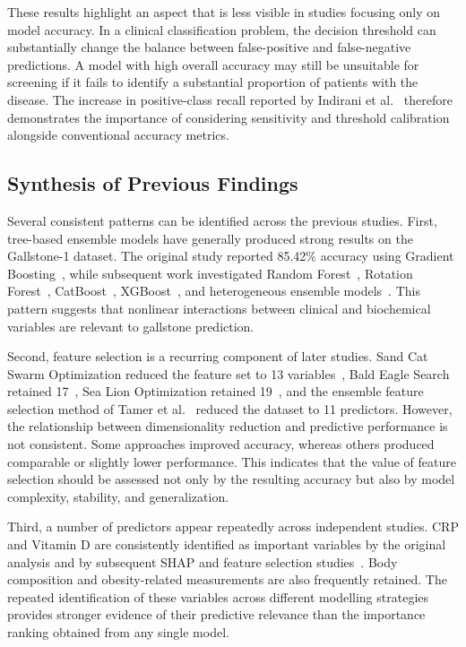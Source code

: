 These results highlight an aspect that is less visible in studies focusing only on model accuracy. In a clinical classification problem, the decision threshold can substantially change the balance between false-positive and false-negative predictions. A model with high overall accuracy may still be unsuitable for screening if it fails to identify a substantial proportion of patients with the disease. The increase in positive-class recall reported by Indirani et al.~\cite{indirani2026ensemble} therefore demonstrates the importance of considering sensitivity and threshold calibration alongside conventional accuracy metrics.

\subsection{Synthesis of Previous Findings}

Several consistent patterns can be identified across the previous studies. First, tree-based ensemble models have generally produced strong results on the Gallstone-1 dataset. The original study reported 85.42\% accuracy using Gradient Boosting~\cite{esen2024early}, while subsequent work investigated Random Forest~\cite{sarker2025gallstone}, Rotation Forest~\cite{shrestha2026metaheuristic}, CatBoost~\cite{das2026sloa}, XGBoost~\cite{rahman2026hbb}, and heterogeneous ensemble models~\cite{indirani2026ensemble}. This pattern suggests that nonlinear interactions between clinical and biochemical variables are relevant to gallstone prediction.

Second, feature selection is a recurring component of later studies. Sand Cat Swarm Optimization reduced the feature set to 13 variables~\cite{sarker2025gallstone}, Bald Eagle Search retained 17~\cite{shrestha2026metaheuristic}, Sea Lion Optimization retained 19~\cite{das2026sloa}, and the ensemble feature selection method of Tamer et al.~\cite{tamer2026novel} reduced the dataset to 11 predictors. However, the relationship between dimensionality reduction and predictive performance is not consistent. Some approaches improved accuracy, whereas others produced comparable or slightly lower performance. This indicates that the value of feature selection should be assessed not only by the resulting accuracy but also by model complexity, stability, and generalization.

Third, a number of predictors appear repeatedly across independent studies. CRP and Vitamin D are consistently identified as important variables by the original analysis and by subsequent SHAP and feature selection studies~\cite{esen2024early,sarker2025gallstone,shrestha2026metaheuristic,das2026sloa,rahman2026hbb}. Body composition and obesity-related measurements are also frequently retained. The repeated identification of these variables across different modelling strategies provides stronger evidence of their predictive relevance than the importance ranking obtained from any single model.

